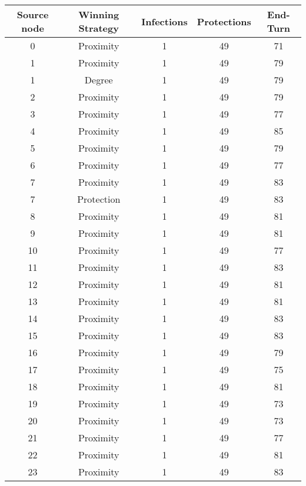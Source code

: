 \documentclass[results.tex]{subfiles}
\begin{document}
\begin{center}
  \begin{tabular}{| c || c | c | c | c |}
    \hline
    {\bfseries Source node} & {\bfseries Winning Strategy} & {\bfseries Infections} & {\bfseries Protections} & {\bfseries End-Turn} \\  %
    \hline\hline
    0 & Proximity & 1 & 49 & 71 \\ 
    \hline
    1 & Proximity & 1 & 49 & 79 \\ 
    \hline
    1 & Degree & 1 & 49 & 79 \\ 
    \hline
    2 & Proximity & 1 & 49 & 79 \\ 
    \hline
    3 & Proximity & 1 & 49 & 77 \\ 
    \hline
    4 & Proximity & 1 & 49 & 85 \\ 
    \hline
    5 & Proximity & 1 & 49 & 79 \\ 
    \hline
    6 & Proximity & 1 & 49 & 77 \\ 
    \hline
    7 & Proximity & 1 & 49 & 83 \\ 
    \hline
    7 & Protection & 1 & 49 & 83 \\ 
    \hline
    8 & Proximity & 1 & 49 & 81 \\ 
    \hline
    9 & Proximity & 1 & 49 & 81 \\ 
    \hline
    10 & Proximity & 1 & 49 & 77 \\ 
    \hline
    11 & Proximity & 1 & 49 & 83 \\ 
    \hline
    12 & Proximity & 1 & 49 & 81 \\ 
    \hline
    13 & Proximity & 1 & 49 & 81 \\ 
    \hline
    14 & Proximity & 1 & 49 & 83 \\ 
    \hline
    15 & Proximity & 1 & 49 & 83 \\ 
    \hline
    16 & Proximity & 1 & 49 & 79 \\ 
    \hline
    17 & Proximity & 1 & 49 & 75 \\ 
    \hline
    18 & Proximity & 1 & 49 & 81 \\ 
    \hline
    19 & Proximity & 1 & 49 & 73 \\ 
    \hline
    20 & Proximity & 1 & 49 & 73 \\ 
    \hline
    21 & Proximity & 1 & 49 & 77 \\ 
    \hline
    22 & Proximity & 1 & 49 & 81 \\ 
    \hline
    23 & Proximity & 1 & 49 & 83 \\ 

\end{tabular}
\end{center}
\end{document}
